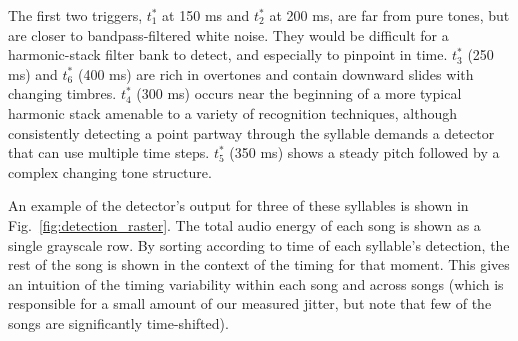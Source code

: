 \documentclass[10pt,letterpaper]{article}
\newcommand\fig[1]{Fig.~\ref{#1}}
\begin{document}
The first two triggers, $t^*_1$ at 150 ms and $t^*_2$ at 200 ms, are
far from pure tones, but are closer to bandpass-filtered white noise.  They would be
difficult for a harmonic-stack filter bank to detect, and especially
to pinpoint in time.  $t^*_3$ (250 ms) and $t^*_6$ (400 ms) are rich
in overtones and contain downward slides with changing timbres.
$t^*_4$ (300 ms) occurs near the beginning of a more typical harmonic
stack amenable to a variety of recognition techniques, although
consistently detecting a point partway through the syllable demands a
detector that can use multiple time steps.  $t^*_5$ (350 ms) shows a
steady pitch followed by a complex changing tone structure.

An example of the detector's output for three of these syllables is
shown in \fig{fig:detection_raster}.  The total audio energy of each
song is shown as a single grayscale row.  By sorting according to time
of each syllable's detection, the rest of the song is shown in the
context of the timing for that moment.  This gives an intuition of the
timing variability within each song and across songs (which is
responsible for a small amount of our measured jitter, but note that few of the songs are significantly time-shifted).
\end{document}
